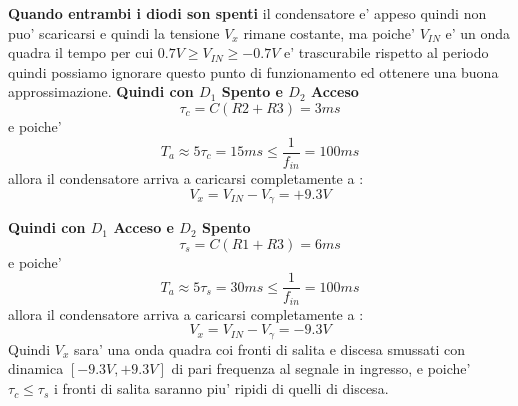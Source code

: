 \documentclass[\main/main.tex]{subfiles}
\begin{document}
\textbf{Quando entrambi i diodi son spenti} il condensatore e' appeso quindi non puo' scaricarsi e quindi la tensione $V_x$ rimane costante, ma poiche' $V_{IN}$ e' un onda quadra il tempo per cui $0.7V \ge V_{IN} \ge -0.7V$ e' trascurabile rispetto al periodo quindi possiamo ignorare questo punto di funzionamento ed ottenere una buona approssimazione.
\taudef
\textbf{Quindi con $D_1$ Spento e $D_2$ Acceso}
\[\tau_c = C (R2 + R3) = 3ms\]
e poiche'
\[T_a \approx 5 \tau_c = 15ms \le \frac{1}{f_{in}} = 100ms\]
allora il condensatore arriva a caricarsi completamente a :
\[V_x = V_{IN} - V_\gamma = + 9.3V \]

\textbf{Quindi con $D_1$ Acceso e $D_2$ Spento}
\[\tau_s = C (R1 + R3) = 6ms\]
e poiche'
\[T_a \approx 5 \tau_s = 30ms \le \frac{1}{f_{in}} = 100ms\]
allora il condensatore arriva a caricarsi completamente a :
\[V_x = V_{IN} - V_\gamma = - 9.3V \]
Quindi $V_x$ sara' una onda quadra coi fronti di salita e discesa smussati con dinamica $[-9.3V,+9.3V]$ di pari frequenza al segnale in ingresso, e poiche' $\tau_c \le \tau_s$ i fronti di salita saranno piu' ripidi di quelli di discesa.


\begin{figure}[H]
    \center
\end{figure}
\end{document}
